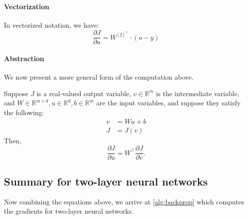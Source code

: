 \paragraph{Vectorization} In vectorized notation, we have:
\begin{equation}
    \frac{\partial J}{\partial a} = W^{[2]^\top} \cdot (o - y)\label{eq:vectorized_activation_gradient}
\end{equation}

\paragraph{Abstraction} We now present a more general form of the computation above.
\begin{claim}\label{cl:claim3}
    Suppose $J$ is a real-valued output variable, $v \in \mathbb{R}^m$ is the
    intermediate variable, and $W \in \mathbb{R}^{m \times d}, u \in \mathbb{R}^d ,b \in \mathbb{R}^m$ are the input variables,
    and suppose they satisfy the following:
    \begin{align*}
        v &= Wu + b\\
        J &= J(v)
    \end{align*}
    Then,
    \begin{equation}
        \frac{\partial J}{\partial u} = W^\top \frac{\partial J}{\partial v}.
    \end{equation}    
\end{claim}

\subsection{Summary for two-layer neural networks} Now combining the
equations above, we arrive at \cref{alg:backprop} which computes the gradients for
two-layer neural networks.

